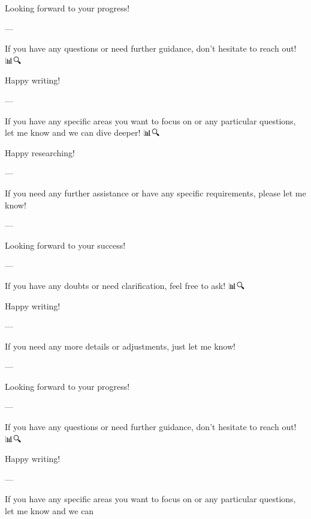 Looking forward to your progress! 🚀🌟

--- 

If you have any questions or need further guidance, don't hesitate to reach out! 📊🔍

Happy writing! 📝✨

--- 

If you have any specific areas you want to focus on or any particular questions, let me know and we can dive deeper! 📊🔍

Happy researching! 📝🚀

--- 

If you need any further assistance or have any specific requirements, please let me know! 🙌

--- 

Looking forward to your success! 🚀🌟

--- 

If you have any doubts or need clarification, feel free to ask! 📊🔍

Happy writing! 📝✨

--- 

If you need any more details or adjustments, just let me know! 🙌

--- 

Looking forward to your progress! 🚀🌟

--- 

If you have any questions or need further guidance, don't hesitate to reach out! 📊🔍

Happy writing! 📝✨

--- 

If you have any specific areas you want to focus on or any particular questions, let me know and we can